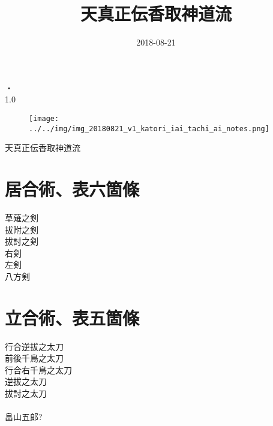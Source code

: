 \documentclass[dvipdfmx, a4paper, 12pt]{utarticle}
\begin{document}
\begin{CJK*}{UTF8}{min}
\CJKtilde
\begin{landscape}

\title{天真正伝香取神道流}
\author{}
\date{2018-08-21}
\maketitle
\thispagestyle{empty} %

\begin{center}
・\\
1.0
\end{center}

\newpage
\pagestyle{empty}
\begin{figure}[H]
\centering
\texttt{[image: ../../img/img\_20180821\_v1\_katori\_iai\_tachi\_ai\_notes.png]}
\end{figure}

\newpage
\pagestyle{empty}
天真正伝香取神道流
\section{居合術、表六箇條}
\noindent 草薙之剣\\
拔附之剣\\
拔討之剣\\
右剣\\
左剣\\
八方剣\\
\section{立合術、表五箇條}
\noindent 行合逆拔之太刀\\
前後千鳥之太刀\\
行合右千鳥之太刀\\
逆拔之太刀\\
拔討之太刀\\
\\
畠山五郎?

\setcounter{section}{0}
\newpage
\pagestyle{empty}

\end{landscape}
\end{CJK*}
\end{document}
